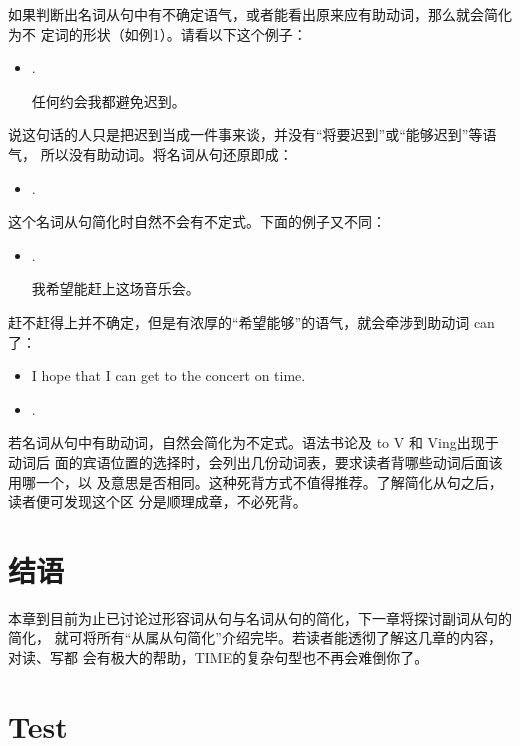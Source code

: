 如果判断出名词从句中有不确定语气，或者能看出原来应有助动词，那么就会简化为不
定词的形状（如例1）。请看以下这个例子：
\begin{itemize}
\item {}  .

  任何约会我都避免迟到。
\end{itemize}
说这句话的人只是把迟到当成一件事来谈，并没有“将要迟到”或“能够迟到”等语气，
所以没有助动词。将名词从句还原即成：
\begin{itemize}
\item {}  .
\end{itemize}

这个名词从句简化时自然不会有不定式。下面的例子又不同：
\begin{itemize}
\item {}  .

  我希望能赶上这场音乐会。
\end{itemize}
赶不赶得上并不确定，但是有浓厚的“希望能够”的语气，就会牵涉到助动词 can
了：
\begin{itemize}
\item I hope that I can get to the concert on time.

\item {}  .
\end{itemize}

若名词从句中有助动词，自然会简化为不定式。语法书论及 to V 和 Ving出现于动词后
面的宾语位置的选择时，会列出几份动词表，要求读者背哪些动词后面该用哪一个，以
及意思是否相同。这种死背方式不值得推荐。了解简化从句之后，读者便可发现这个区
分是顺理成章，不必死背。

\section{结语}

本章到目前为止已讨论过形容词从句与名词从句的简化，下一章将探讨副词从句的简化，
就可将所有“从属从句简化”介绍完毕。若读者能透彻了解这几章的内容，对读、写都
会有极大的帮助，TIME的复杂句型也不再会难倒你了。

\section{Test}

